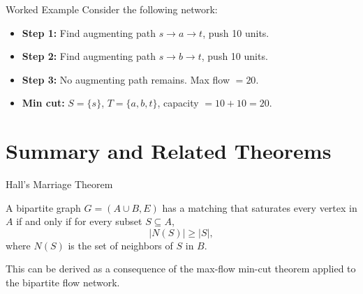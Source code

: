 \documentclass[aspectratio=169]{beamer}
\begin{document}
\begin{frame}{Worked Example}
  Consider the following network:

  \begin{center}
  \end{center}

  \begin{itemize}
    \item \textbf{Step 1:} Find augmenting path $s \to a \to t$, push 10 units.
    \item \textbf{Step 2:} Find augmenting path $s \to b \to t$, push 10 units.
    \item \textbf{Step 3:} No augmenting path remains. Max flow $= 20$.
    \item \textbf{Min cut:} $S = \{s\}$, $T = \{a, b, t\}$, capacity $= 10 + 10 = 20$.
  \end{itemize}
\end{frame}

\section{Summary and Related Theorems}

\begin{frame}{Hall's Marriage Theorem}
  \begin{theorem}[Hall, 1935]
    A bipartite graph $G = (A \cup B, E)$ has a matching that saturates every
    vertex in $A$ if and only if for every subset $S \subseteq A$,
    \[
      |N(S)| \geq |S|,
    \]
    where $N(S)$ is the set of neighbors of $S$ in $B$.
  \end{theorem}

  \vspace{0.5em}
  This can be derived as a consequence of the max-flow min-cut theorem applied
  to the bipartite flow network.
\end{frame}
\end{document}

